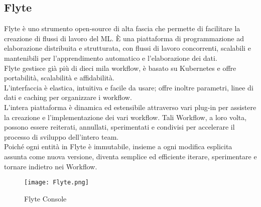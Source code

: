 \documentclass[../tesi.tex]{subfiles}
\begin{document}
\subsection{Flyte}
Flyte è uno strumento open-source di alta fascia che permette di facilitare la creazione di flussi di lavoro del ML. È una piattaforma di programmazione ad elaborazione distribuita e strutturata, con flussi di lavoro concorrenti, scalabili e mantenibili per l’apprendimento automatico e l’elaborazione dei dati.\\
Flyte gestisce già più di dieci mila workflow, è basato su Kubernetes e offre portabilità, scalabilità e affidabilità.\\
L’interfaccia è elastica, intuitiva e facile da usare; offre inoltre parametri, linee di dati e caching per organizzare i workflow.\\
L’intera piattaforma è dinamica ed estensibile attraverso vari plug-in per assistere la creazione e l’implementazione dei vari workflow. Tali Workflow, a loro volta, possono essere reiterati, annullati, sperimentati e condivisi per accelerare il processo di sviluppo dell’intero team.\\
Poiché ogni entità in Flyte è immutabile, insieme a ogni modifica esplicita assunta come nuova versione, diventa semplice ed efficiente iterare, sperimentare e tornare indietro nei Workflow.
\begin{figure}[htbp]
  \centering
  \texttt{[image: Flyte.png]} 
  \caption{Flyte Console}
  \end{figure}
\end{document}
